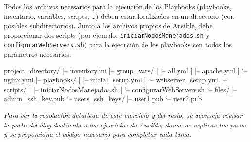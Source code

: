 Todos los archivos necesarios para la ejecución de los Playbooks (playbooks, inventario, variables, scripts, …) deben estar localizados en un directorio (con posibles subdirectorios). Junto a los archivos propios de Ansible, debe proporcionar dos scripts (por ejemplo, \texttt{iniciarNodosManejados.sh} y \texttt{configurarWebServers.sh}) para la ejecución de los playbooks con todos los parámetros necesarios.


\begin{directorylisting}
  project_directory/
  |-- inventory.ini
  |-- group_vars/
  |   |-- all.yml
  |   |-- apache.yml
  |   `-- nginx.yml
  |-- playbooks/
  |   |-- initial_setup.yml
  |   `-- webserver_setup.yml
  |-- scripts/
  |   |-- iniciarNodosManejados.sh
  |   `-- configurarWebServers.sh
  `-- files/
      |-- admin_ssh_key.pub
      `-- users_ssh_keys/
          |-- user1.pub
          `-- user2.pub
  \end{directorylisting}


\textit{Para ver la resolución detallada de este ejercicio y del resto, se aconseja revisar la parte del blog destinada a los ejercicios de Ansible, donde se explican los pasos y se proporciona el código necesario para completar cada tarea. 
}





